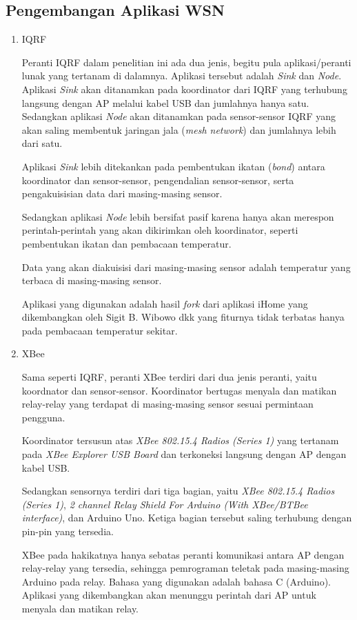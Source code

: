 		\subsection{Pengembangan Aplikasi WSN}
			\begin{enumerate}
				\item IQRF

					Peranti IQRF dalam penelitian ini ada dua jenis, begitu pula aplikasi/peranti lunak yang tertanam di dalamnya. Aplikasi tersebut adalah \emph{Sink} dan \emph{Node}. Aplikasi \emph{Sink} akan ditanamkan pada koordinator dari IQRF yang terhubung langsung dengan AP melalui kabel USB dan jumlahnya hanya satu. Sedangkan aplikasi \emph{Node} akan ditanamkan pada sensor-sensor IQRF yang akan saling membentuk jaringan jala (\emph{mesh network}) dan jumlahnya lebih dari satu.

					Aplikasi \emph{Sink} lebih ditekankan pada pembentukan ikatan (\emph{bond}) antara koordinator dan sensor-sensor, pengendalian sensor-sensor, serta pengakuisisian data dari masing-masing sensor.

					Sedangkan aplikasi \emph{Node} lebih bersifat pasif karena hanya akan merespon perintah-perintah yang akan dikirimkan oleh koordinator, seperti pembentukan ikatan dan pembacaan temperatur.

					Data yang akan diakuisisi dari masing-masing sensor adalah temperatur yang terbaca di masing-masing sensor.

					Aplikasi yang digunakan adalah hasil \emph{fork} dari aplikasi iHome yang dikembangkan oleh Sigit B. Wibowo dkk yang fiturnya tidak terbatas hanya pada pembacaan temperatur sekitar.

				\item XBee

					Sama seperti IQRF, peranti XBee terdiri dari dua jenis peranti, yaitu koordnator dan sensor-sensor. Koordinator bertugas menyala dan matikan relay-relay yang terdapat di masing-masing sensor sesuai permintaan pengguna.

					Koordinator tersusun atas \emph{XBee 802.15.4 Radios (Series 1)} yang tertanam pada \emph{XBee Explorer USB Board} dan terkoneksi langsung dengan AP dengan kabel USB.

					Sedangkan sensornya terdiri dari tiga bagian, yaitu \emph{XBee 802.15.4 Radios (Series 1)}, \emph{2 channel Relay Shield For Arduino (With XBee/BTBee interface)}, dan Arduino Uno. Ketiga bagian tersebut saling terhubung dengan pin-pin yang tersedia.

					XBee pada hakikatnya hanya sebatas peranti komunikasi antara AP dengan relay-relay yang tersedia, sehingga pemrograman teletak pada masing-masing Arduino pada relay. Bahasa yang digunakan adalah bahasa C (Arduino). Aplikasi yang dikembangkan akan menunggu perintah dari AP untuk menyala dan matikan relay.

			\end{enumerate}

